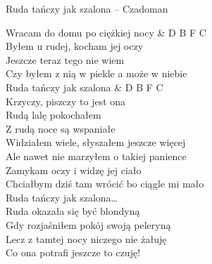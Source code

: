 \begin{piosenka}{Ruda tańczy jak szalona -- Czadoman}

Wracam do domu po ciężkiej nocy & D B F C \\
Byłem u rudej, kocham jej oczy \\
Jeszcze teraz tego nie wiem \\
Czy byłem z nią w piekle a może w niebie \\[\zwrotkaspace]

 Ruda tańczy jak szalona & D B F C \\
 Krzyczy, piszczy to jest ona \\
 Rudą lalę pokochałem \\
 Z rudą noce są wspaniałe \\[\zwrotkaspace]

Widziałem wiele, słyszałem jeszcze więcej \\
Ale nawet nie marzyłem o takiej panience \\
Zamykam oczy i widzę jej ciało \\
Chciałbym dziś tam wrócić bo ciągle mi mało \\[\zwrotkaspace]

 Ruda tańczy jak szalona\ldots \\[\zwrotkaspace]

Ruda okazała się być blondyną \\
Gdy rozjaśniłem pokój swoją peleryną \\
Lecz z tamtej nocy niczego nie żałuję \\
Co ona potrafi jeszcze to czuję! \\[\zwrotkaspace]

\end{piosenka}